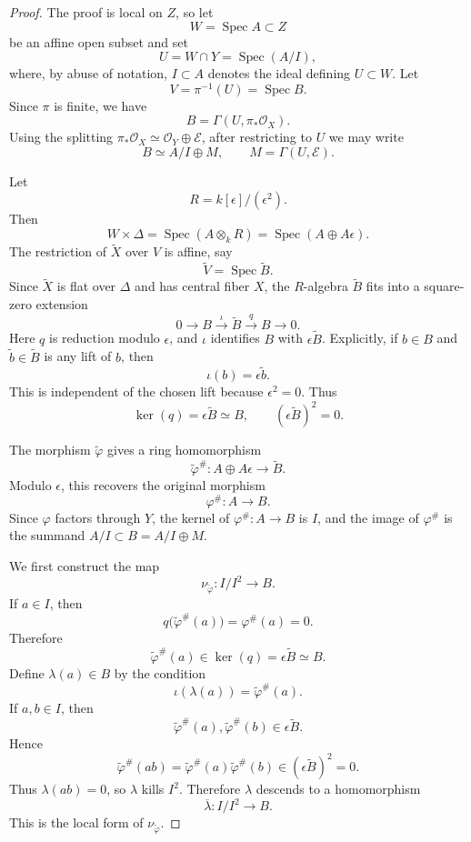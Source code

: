 \documentclass[11pt,twoside]{amsart}
\theoremstyle{plain}
\numberwithin{equation}{section}
\theoremstyle{definition}
\begin{document}
\begin{proof}
The proof is local on \(Z\), so let
\[
    W=\operatorname{Spec}A\subset Z
\]
be an affine open subset and set
\[
    U=W\cap Y=\operatorname{Spec}(A/I),
\]
where, by abuse of notation, \(I\subset A\) denotes the ideal defining \(U\subset W\).
Let
\[
    V=\pi^{-1}(U)=\operatorname{Spec}B.
\]
Since \(\pi\) is finite, we have
\[
    B=\Gamma(U,\pi_*\mathcal O_X).
\]
Using the splitting \(\pi_*\mathcal O_X\simeq \mathcal O_Y\oplus \mathcal E\), after restricting to
\(U\) we may write
\[
    B\simeq A/I\oplus M,
    \qquad
    M=\Gamma(U,\mathcal E).
\]

Let
\[
    R=k[\epsilon]/(\epsilon^2).
\]
Then
\[
    W\times\Delta=\operatorname{Spec}(A\otimes_k R)
    =
    \operatorname{Spec}(A\oplus A\epsilon).
\]
The restriction of \(\widetilde X\) over \(V\) is affine, say
\[
    \widetilde V=\operatorname{Spec}\widetilde B.
\]
Since \(\widetilde X\) is flat over \(\Delta\) and has central fiber \(X\), the \(R\)-algebra
\(\widetilde B\) fits into a square-zero extension
\[
    0\longrightarrow B
    \xrightarrow{\iota}
    \widetilde B
    \xrightarrow{q}
    B
    \longrightarrow 0.
\]
Here \(q\) is reduction modulo \(\epsilon\), and \(\iota\) identifies \(B\) with
\(\epsilon\widetilde B\). Explicitly, if \(b\in B\) and \(\widetilde b\in \widetilde B\) is any lift of \(b\),
then
\[
    \iota(b)=\epsilon\widetilde b.
\]
This is independent of the chosen lift because \(\epsilon^2=0\). Thus
\[
    \ker(q)=\epsilon\widetilde B\simeq B,
    \qquad
    (\epsilon\widetilde B)^2=0.
\]

The morphism \(\widetilde\varphi\) gives a ring homomorphism
\[
    \widetilde\varphi^\#:
    A\oplus A\epsilon
    \longrightarrow
    \widetilde B.
\]
Modulo \(\epsilon\), this recovers the original morphism
\[
    \varphi^\#:A\to B.
\]
Since \(\varphi\) factors through \(Y\), the kernel of \(\varphi^\#:A\to B\) is \(I\), and the image
of \(\varphi^\#\) is the summand \(A/I\subset B=A/I\oplus M\).

We first construct the map
\[
    \nu_{\widetilde\varphi}: I/I^2\to B.
\]
If \(a\in I\), then
\[
    q\bigl(\widetilde\varphi^\#(a)\bigr)
    =
    \varphi^\#(a)
    =
    0.
\]
Therefore
\[
    \widetilde\varphi^\#(a)\in \ker(q)=\epsilon\widetilde B\simeq B.
\]
Define \(\lambda(a)\in B\) by the condition
\[
    \iota(\lambda(a))=\widetilde\varphi^\#(a).
\]
If \(a,b\in I\), then
\[
    \widetilde\varphi^\#(a),\widetilde\varphi^\#(b)\in \epsilon\widetilde B.
\]
Hence
\[
    \widetilde\varphi^\#(ab)
    =
    \widetilde\varphi^\#(a)\widetilde\varphi^\#(b)
    \in
    (\epsilon\widetilde B)^2
    =
    0.
\]
Thus \(\lambda(ab)=0\), so \(\lambda\) kills \(I^2\). Therefore \(\lambda\) descends to a homomorphism
\[
    \overline{\lambda}: I/I^2\to B.
\]
This is the local form of \(\nu_{\widetilde\varphi}\).


\end{proof}
\end{document}

